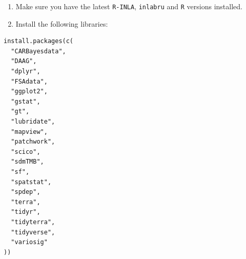 \documentclass[
  letterpaper,
  DIV=11,
  numbers=noendperiod]{scrartcl}
\providecommand{\tightlist}{%
  \setlength{\itemsep}{0pt}\setlength{\parskip}{0pt}}\usepackage{longtable,booktabs,array}
\begin{document}
\begin{enumerate}
\def\labelenumi{\arabic{enumi}.}
\setcounter{enumi}{2}
\tightlist
\item
  Make sure you have the latest \texttt{R-INLA}, \texttt{inlabru} and
  \texttt{R} versions installed.
\item
  Install the following libraries:
\end{enumerate}

\begin{verbatim}
install.packages(c(
  "CARBayesdata",
  "DAAG",
  "dplyr",
  "FSAdata",
  "ggplot2",
  "gstat",
  "gt",
  "lubridate",
  "mapview",
  "patchwork",
  "scico",
  "sdmTMB",
  "sf",
  "spatstat",
  "spdep",
  "terra",
  "tidyr",
  "tidyterra",
  "tidyverse",
  "variosig"
))
\end{verbatim}
\end{document}
